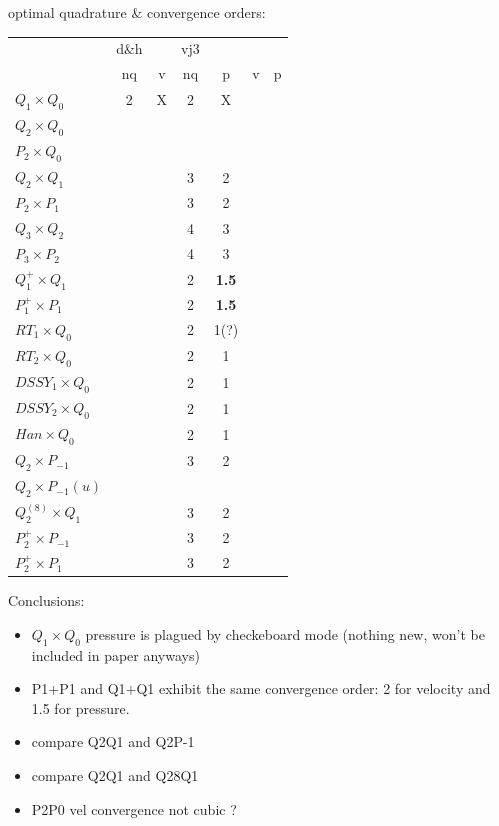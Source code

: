 \newpage
optimal quadrature \& convergence orders:

\begin{center}
\begin{tabular}{l|ccc|ccc|}
\hline
                     & d\&h &   & vj3 & \\
                     & nq &v    & nq & p & v & p \\
\hline
\hline
$Q_1\times Q_0$       & 2    & X & 2 & X  \\%
$Q_2\times Q_0$       &     &  &  &       \\%
$P_2\times Q_0$       &     &  &  &       \\%
$Q_2\times Q_1$       &      &   & 3 & 2  \\%
$P_2\times P_1$       &      &   & 3 & 2  \\%
$Q_3\times Q_2$       &      &   & 4 & 3  \\%
$P_3\times P_2$       &      &   & 4 & 3  \\%
$Q_1^+\times Q_1$     &      &   & 2 & {\bf 1.5}  \\%
$P_1^+\times P_{1}$   &      &   & 2 & {\bf 1.5}  \\%
$RT_1\times Q_0$      &      &   & 2 & 1(?)\\%
$RT_2\times Q_0$      &      &   & 2 & 1   \\%
$DSSY_1\times Q_0$    &      &   & 2 & 1   \\%
$DSSY_2\times Q_0$    &      &   & 2 & 1   \\%
$Han\times Q_0$       &      &   & 2 & 1   \\%
$Q_2\times P_{-1}$    &      &   & 3 & 2   \\%
$Q_2\times P_{-1}(u)$ &      &   &  &      \\%
$Q_2^{(8)}\times Q_1$ &      &   & 3 & 2   \\%
$P_2^+\times P_{-1}$  &      &   & 3 & 2   \\%
$P_2^+\times P_{1}$   &      &   & 3 & 2   \\%
\hline
\end{tabular} 
\end{center}

\vspace{1cm}

Conclusions:
\begin{itemize}
\item $Q_1\times Q_0$ pressure is plagued by checkeboard mode (nothing new, won't be included in paper anyways)
\item P1+P1 and Q1+Q1 exhibit the same convergence order: 2 for velocity and 1.5 for pressure.
\item compare Q2Q1 and Q2P-1
\item compare Q2Q1 and Q28Q1
\item P2P0 vel convergence not cubic ?
\end{itemize}

